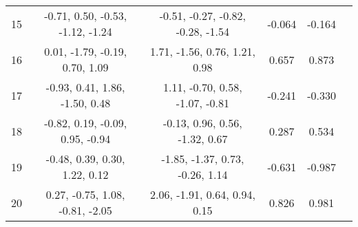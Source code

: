 \documentclass[11pt]{article}
\begin{document}
\begin{table}[ht]
\begin{tabular}{ | c | c | c | c | c | c |}
15 & \tiny -0.71, 0.50, -0.53, -1.12, -1.24 & \tiny -0.51, -0.27, -0.82, -0.28, -1.54 & \tiny -0.064 & \tiny -0.164 & \\
16 & \tiny 0.01, -1.79, -0.19, 0.70, 1.09 & \tiny 1.71, -1.56, 0.76, 1.21, 0.98 & \tiny 0.657 & \tiny 0.873 & \\
17 & \tiny -0.93, 0.41, 1.86, -1.50, 0.48 & \tiny 1.11, -0.70, 0.58, -1.07, -0.81 & \tiny -0.241 & \tiny -0.330 & \\
18 & \tiny -0.82, 0.19, -0.09, 0.95, -0.94 & \tiny -0.13, 0.96, 0.56, -1.32, 0.67 & \tiny 0.287 & \tiny 0.534 & \\
19 & \tiny -0.48, 0.39, 0.30, 1.22, 0.12 & \tiny -1.85, -1.37, 0.73, -0.26, 1.14 & \tiny -0.631 & \tiny -0.987 & \\
20 & \tiny 0.27, -0.75, 1.08, -0.81, -2.05 & \tiny 2.06, -1.91, 0.64, 0.94, 0.15 & \tiny 0.826 & \tiny 0.981 & \\
\hline
\end{tabular}
\label{table:sim0d}
\end{table}
\end{document}
